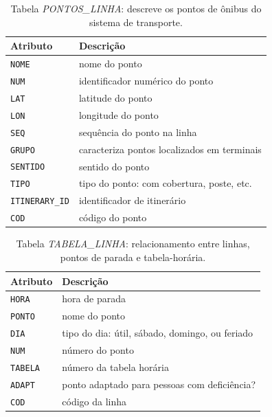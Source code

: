  
\begin{table}[htb]
    \caption{Tabela \emph{PONTOS\_LINHA}: descreve os pontos de ônibus do sistema de transporte.}
    \centering
    \begin{tabular}{ p{5cm}p{9cm}} 
        \hline
        Atributo & Descrição\\
        \hline
        \texttt{NOME} & nome do ponto \\
        \texttt{NUM} & identificador numérico do ponto \\
        \texttt{LAT} & latitude do ponto \\
        \texttt{LON} & longitude do ponto \\
        \texttt{SEQ} & sequência do ponto na linha\\
        \texttt{GRUPO} & caracteriza pontos localizados em terminais \\
        \texttt{SENTIDO} & sentido do ponto \\
        \texttt{TIPO} & tipo do ponto: com cobertura, poste, etc. \\
        \texttt{ITINERARY\_ID} & identificador de itinerário \\
        \texttt{COD} & código do ponto \\
        \hline 
    \end{tabular}
    \label{tab:pontos_linha}
\end{table}

\begin{table}[h]
\caption{Tabela \emph{TABELA\_LINHA}: relacionamento entre linhas, pontos de parada e tabela-horária.}
    \centering
    \begin{tabular}{ p{5cm}p{9cm}} 
        \hline
        Atributo & Descrição\\
        \hline
        \texttt{HORA}   & hora de parada \\
        \texttt{PONTO}  & nome do ponto  \\
        \texttt{DIA}    & tipo do dia: útil, sábado, domingo, ou feriado \\
        \texttt{NUM}    & número do ponto \\
        \texttt{TABELA} & número da tabela horária  \\
        \texttt{ADAPT}  & ponto adaptado para pessoas com deficiência? \\
        \texttt{COD} & código da linha \\
        \hline 
    \end{tabular}
    \label{tab:tabela_linha}
\end{table}

